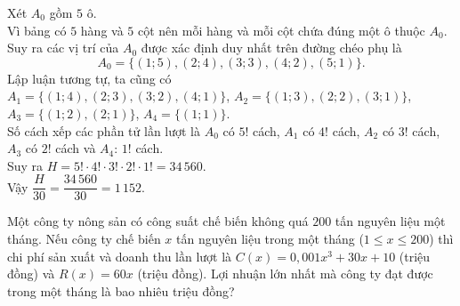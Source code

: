 \begin{ex}
{		Xét $A_0$ gồm $5$ ô.\\
		Vì bảng có $5$ hàng và $5$ cột nên mỗi hàng và mỗi cột chứa đúng một ô thuộc $A_0$.\\
		Suy ra các vị trí của $A_0$ được xác định duy nhất trên đường chéo phụ là
		\[A_0 = \big\{(1;5), (2;4), (3;3), (4;2), (5;1)\big\}.\]
		Lập luận tương tự, ta cũng có\\
		$A_1 = \big\{(1;4), (2;3), (3;2), (4;1)\big\}$, $A_2 = \big\{(1;3), (2;2), (3;1)\big\}$, $A_3 = \big\{(1;2), (2;1)\big\}$, $A_4 = \big\{(1;1)\big\}$.\\
		Số cách xếp các phần tử lần lượt là $A_0$ có $5!$ cách, $A_1$ có $4!$ cách, $A_2$ có $3!$ cách, $A_3$ có $2!$ cách và $A_4$: $1!$ cách.\\
		Suy ra $H = 5! \cdot 4! \cdot 3! \cdot 2! \cdot 1! = 34\,560$.\\
		Vậy $\dfrac{H}{30} = \dfrac{34\,560}{30} = 1\,152$.
	}
\end{ex}

\begin{ex}%
	Một công ty nông sản có công suất chế biến không quá $200$ tấn nguyên liệu một tháng. Nếu công ty chế biến $x$ tấn nguyên liệu trong một tháng ($1 \leq x \leq 200$) thì chi phí sản xuất và doanh thu lần lượt là $C(x)=0{,}001x^3+30x+10$ (triệu đồng) và $R(x)=60x$ (triệu đồng). Lợi nhuận lớn nhất mà công ty đạt được trong một tháng là bao nhiêu triệu đồng?
	\par {}
\end{ex}

